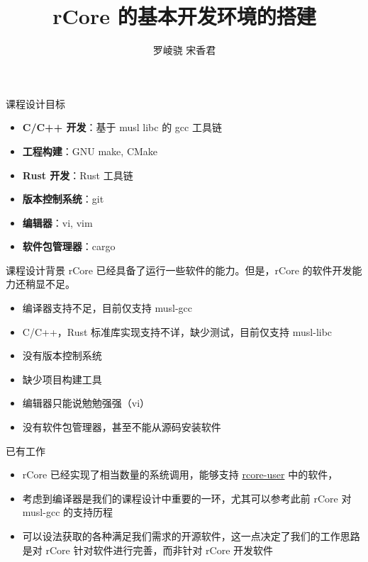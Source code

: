\documentclass{beamer}
\title{rCore 的基本开发环境的搭建}
\author{罗崚骁 \quad 宋香君}
\begin{document}
\begin{frame}
    \titlepage
\end{frame}

\begin{frame}{课程设计目标}
    \begin{itemize}
        \setlength{\itemsep}{10pt}
        \item \textbf{C/C++ 开发}：基于 musl libc 的 gcc 工具链
        \item \textbf{工程构建}：GNU make, CMake
        \item \textbf{Rust 开发}：Rust 工具链
        \item \textbf{版本控制系统}：git
        \item \textbf{编辑器}：vi, vim
        \item \textbf{软件包管理器}：cargo
    \end{itemize}

\end{frame}

\begin{frame}{课程设计背景}
    rCore 已经具备了运行一些软件的能力。但是，rCore 的软件开发能力还稍显不足。

    \begin{itemize}
        \setlength{\itemsep}{10pt}
        \item 编译器支持不足，目前仅支持 musl-gcc
        \item C/C++，Rust 标准库实现支持不详，缺少测试，目前仅支持 musl-libc
        \item 没有版本控制系统
        \item 缺少项目构建工具
        \item 编辑器只能说勉勉强强（vi）
        \item 没有软件包管理器，甚至不能从源码安装软件
    \end{itemize}
\end{frame}

\begin{frame}{已有工作}
    \begin{itemize}
        \setlength{\itemsep}{10pt}
        \item rCore 已经实现了相当数量的系统调用，能够支持 \href{https://github.com/rcore-os/rcore-user}{rcore-user} 中的软件，
        \item 考虑到编译器是我们的课程设计中重要的一环，尤其可以参考此前 rCore 对 musl-gcc 的支持历程
        \item 可以设法获取的各种满足我们需求的开源软件，这一点决定了我们的工作思路是对 rCore 针对软件进行完善，而非针对 rCore 开发软件
    \end{itemize}
\end{frame}
\end{document}
